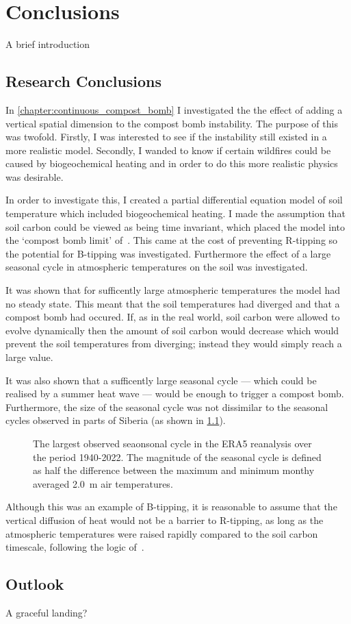 \chapter{Conclusions}
\graphicspath{{conclusions/figs}}

A brief introduction

\section{Research Conclusions}
In \cref{chapter:continuous_compost_bomb} I investigated the the effect of adding a vertical spatial dimension to the compost bomb instability.
The purpose of this was twofold. 
Firstly, I was interested to see if the instability still existed in a more realistic model.
Secondly, I wanded to know if certain wildfires could be caused by biogeochemical heating and in order to do this more realistic physics was desirable.

In order to investigate this, I created a partial differential equation model of soil temperature which included biogeochemical heating. I made the assumption
that soil carbon could be viewed as being time invariant, which placed the model into the `compost bomb limit' of~\cite{Luke2011}. This came at the cost of preventing
R-tipping so the potential for B-tipping was investigated. Furthermore the effect of a large seasonal cycle in atmospheric temperatures on the soil was investigated.

It was shown that for sufficently large atmospheric temperatures the model had no steady state. This meant that the soil temperatures had diverged and that a compost bomb
had occured. If, as in the real world, soil carbon were allowed to evolve dynamically then the amount of soil carbon would decrease which would prevent the soil temperatures from diverging;
instead they would simply reach a large value.

It was also shown that a sufficently large seasonal cycle --- which could be realised by a summer heat wave --- would be enough to trigger a compost bomb.
Furthermore, the size of the seasonal cycle was not dissimilar to the seasonal cycles observed in parts of Siberia (as shown in \cref{fig:seasonal_cycle_maps}).

\begin{figure}
  \centering
  \caption[Map of Seasonal Cycles]{The largest observed seaonsonal cycle in the ERA5 reanalysis \parencite{ERA5} over the period 1940-2022.
    The magnitude of the seasonal cycle is defined as half the difference between the maximum and minimum monthy averaged \SI{2.0}{\meter} air temperatures.}
  \label{fig:seasonal_cycle_maps}
\end{figure}


Although this was an example of B-tipping, it is reasonable to assume that the vertical diffusion of heat would not be a barrier to
R-tipping, as long as the atmospheric temperatures were raised rapidly compared to the soil carbon timescale, following the logic of~\cite{Luke2011}.
\section{Outlook}

A graceful landing?